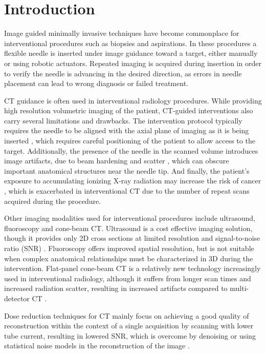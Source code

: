 \section{Introduction}

Image guided minimally invasive techniques have become commonplace for interventional procedures such as biopsies and aspirations.
In these procedures a flexible needle is inserted under image guidance toward a target, either manually or using robotic actuators. Repeated imaging is acquired during insertion in order to verify the needle is advancing in the desired direction, as errors in needle placement can lead to wrong diagnosis or failed treatment.

CT guidance is often used in interventional radiology procedures.
While providing high resolution volumetric imaging of the patient, CT-guided interventions also carry several limitations and drawbacks.
The intervention protocol typically requires the needle to be aligned with the axial plane of imaging as it is being inserted \cite{gupta2014ct}, which requires careful positioning of the patient to allow access to the target.
Additionally, the presence of the needle in the scanned volume introduces image artifacts, due to beam hardening and scatter \cite{boas2012ctartifacts}, which can obscure important anatomical structures near the needle tip.
And finally, the patient's exposure to accumulating ionizing X-ray radiation may increase the risk of cancer \cite{mettler2000ct, chodick2007excess}, which is exacerbated in interventional CT due to the number of repeat scans acquired during the procedure.

Other imaging modalities used for interventional procedures include ultrasound, fluoroscopy and cone-beam CT.
Ultrasound is a cost effective imaging solution, though it provides only 2D cross sections at limited resolution and signal-to-noise ratio (SNR) \cite{sheafor2000comparison}.
Fluoroscopy offers improved spatial resolution, but is not suitable when complex anatomical relationships must be characterized in 3D during the intervention.
Flat-panel cone-beam CT is a relatively new technology increasingly used in interventional radiology, although it suffers from longer scan times and increased radiation scatter, resulting in increased artifacts compared to multi-detector CT \cite{orth2008cbct}.

Dose reduction techniques for CT mainly focus on achieving a good quality of reconstruction within the context of a single acquisition by scanning with lower tube current, resulting in lowered SNR, which is overcome by denoising \cite{manduca2009projection} or using statistical noise models in the reconstruction of the image \cite{zhang2016statistical,kim2015sparseview,niu2014sparse,liu2014total}. 

